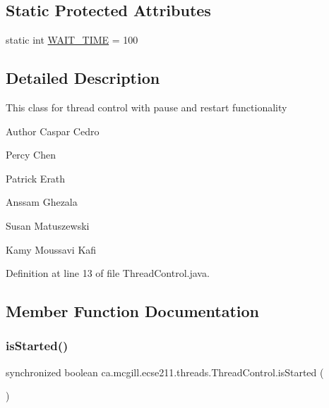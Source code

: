 \subsection*{Static Protected Attributes}
\begin{DoxyCompactItemize}
\item 
static int \hyperlink{classca_1_1mcgill_1_1ecse211_1_1threads_1_1_thread_control_a395cfe1d73b3ef14da0830ed0a499f82}{W\+A\+I\+T\+\_\+\+T\+I\+ME} = 100
\end{DoxyCompactItemize}


\subsection{Detailed Description}
This class for thread control with pause and restart functionality

\begin{DoxyAuthor}{Author}
Caspar Cedro 

Percy Chen 

Patrick Erath 

Anssam Ghezala 

Susan Matuszewski 

Kamy Moussavi Kafi 
\end{DoxyAuthor}


Definition at line 13 of file Thread\+Control.\+java.



\subsection{Member Function Documentation}
\mbox{\label{classca_1_1mcgill_1_1ecse211_1_1threads_1_1_thread_control_a92f4933511db42476e39956246bcf2fe}} 
\subsubsection{\texorpdfstring{is\+Started()}{isStarted()}}
{\footnotesize\ttfamily synchronized boolean ca.\+mcgill.\+ecse211.\+threads.\+Thread\+Control.\+is\+Started (\begin{DoxyParamCaption}{ }\end{DoxyParamCaption})}


